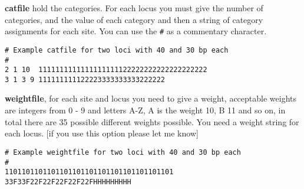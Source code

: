 \begin{description}
\item{\bf catfile} hold the categories. For each locus you must give
the number of categories, and the value of each category and then a string of
category assignments for each site. You can use the {\tt \#} as a commentary character.\\
\begin{small}
\begin{verbatim}
# Example catfile for two loci with 40 and 30 bp each
#
2 1 10  1111111111111111111122222222222222222222
3 1 3 9 111111111122223333333333222222
\end{verbatim}
\end{small}
\item{\bf weightfile}, for each site and locus you need to give a weight, acceptable weights are
integers from 0 - 9 and letters A-Z, A is the weight 10, B 11 and so on, in total
there are 35 possible different weights possible. { You need  a weight string for
each locus}. [if you use this option please let me know]\\
\begin{small}
\begin{verbatim}
# Example weightfile for two loci with 40 and 30 bp each
# 
1101101101101101101101101101101101101101
33F33F22F22F22F22F22FHHHHHHHHH
\end{verbatim}
\end{small}
\end{description}
\newpage
